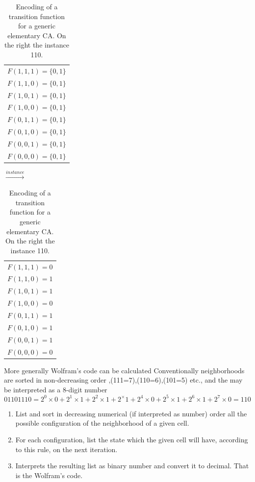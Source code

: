\begin{table}
\caption{Encoding of a transition function for a generic elementary CA. On the
right the instance 110.}
\centering
\begin{tabular}{l}
\label{wolframcodeGeneral}

\hfill \\
\hline
  $F(1,1,1)=\{0,1\}$  \\
  $F(1,1,0)=\{0,1\}$  \\
  $F(1,0,1)=\{0,1\}$  \\
  $F(1,0,0)=\{0,1\}$  \\
  $F(0,1,1)=\{0,1\}$  \\
  $F(0,1,0)=\{0,1\}$  \\
  $F(0,0,1)=\{0,1\}$  \\
  $F(0,0,0)=\{0,1\}$  \\
\hline
\end{tabular}
\quad
$\overset{instance}{\longrightarrow}$
\begin{tabular}{l}

\label{wolframcoderule}
\hfill \\
\hline
  $F(1,1,1)=0$  \\
  $F(1,1,0)=1$  \\
  $F(1,0,1)=1$  \\
  $F(1,0,0)=0$  \\
  $F(0,1,1)=1$  \\
  $F(0,1,0)=1$  \\
  $F(0,0,1)=1$  \\
  $F(0,0,0)=0$  \\
\hline
\end{tabular}
\end{table}

More generally Wolfram's code\cite{wolfram1983,wolfram2002} can be calculated 
Conventionally neighborhoods are sorted in non-decreasing order
,(111=7),(110=6),(101=5) etc., and the may be interpreted as a 8-digit number
\[01101110=2^0\times0+2^1\times1+2^2\times1+2^\times1+2^4\times0+2^5\times1+2^6\times1+2^7\times0=110\]


\begin{enumerate}
  \item List and sort in decreasing numerical (if interpreted as number) order
  all the possible configuration of the neighborhood of a given cell.
  \item For each configuration, list the state which the given cell will have,
  according to this rule, on the next iteration.
  \item Interprets the resulting list as binary number and convert it to
  decimal. That  is the Wolfram's code.
\end{enumerate}

